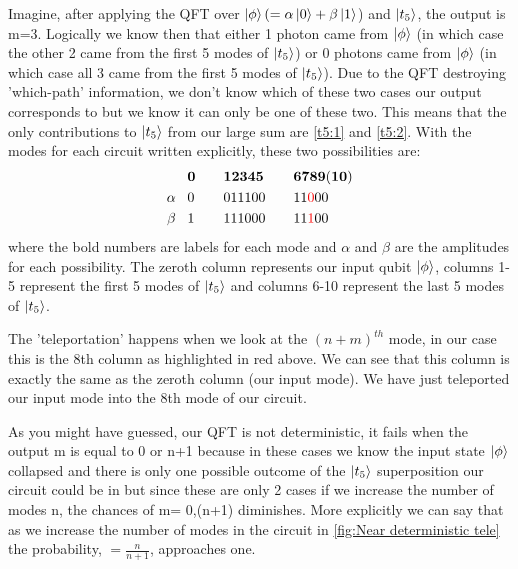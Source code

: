 \par
Imagine, after applying the QFT over $\ket{\phi} (= \alpha\ket{0} + \beta\ket{1}$) and $\ket{t_5}$, the output is m=3. Logically we know then that either 1 photon came from $\ket{\phi}$ (in which case the other 2 came from the first 5 modes of $\ket{t_5}$) or 0 photons came from $\ket{\phi}$ (in which case all 3 came from the first 5 modes of $\ket{t_5}$). Due to the QFT destroying 'which-path' information, we don't know which of these two cases our output corresponds to but we know it can only be one of these two. This means that the only contributions to $\ket{t_5}$ from our large sum are \ref{t5:1} and \ref{t5:2}. With the modes for each circuit written explicitly, these two possibilities are:
 \begin{alignat*}{0}
        &\mathbf{0} \quad  &  &\mathbf{1 2 3 4 5}  \quad &  &\mathbf{6 7 8 9 (10)}\\
        \alpha \;\;\;  &0 \quad &  &0 1 1 1 0 0  \quad  &  &1 1 {\color{red}0} 0 0 \\
        \beta  \;\;\; &1 \quad  &  &1 1 1 0 0 0 \quad &  &1 1 {\color{red}1} 0 0 \\
\end{alignat*}
where the bold numbers are labels for each mode and $\alpha$ and $\beta$ are the amplitudes for each possibility. The zeroth column represents our input qubit $\ket{\phi}$, columns 1-5 represent the first 5 modes of $\ket{t_5}$ and columns 6-10 represent the last 5 modes of $\ket{t_5}$.
\par
The 'teleportation' happens when we look at the $(n+m)^{th}$ mode, in our case this is the 8th column as highlighted in red above.  We can see that this column is exactly the same as the zeroth column (our input mode). We have just teleported our input mode into the 8th mode of our circuit. 
\par
As you might have guessed, our QFT is not deterministic, it fails when the output m is equal to 0 or n+1 because in these cases we know the input state $\ket{\phi}$ collapsed and there is only one possible outcome of the $\ket{t_5}$ superposition our circuit could be in but since these are only 2 cases if we increase the number of modes n, the chances of m= 0,(n+1) diminishes. More explicitly we can say that as we increase the number of modes in the circuit in \ref{fig:Near deterministic tele} the probability, $= \frac{n}{n+1}$, approaches one.

